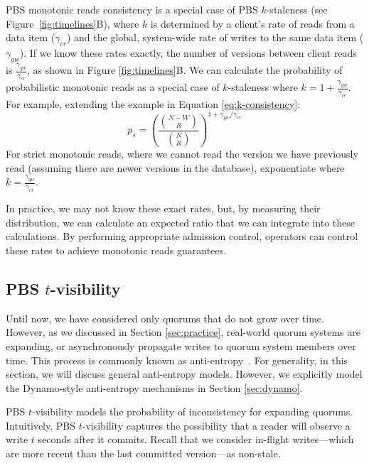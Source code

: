 \documentclass{vldb}
\newcommand{\subsectionskip}{-0em}
\begin{document}
PBS monotonic reads consistency is a special case of PBS $k$-staleness (see
Figure~\ref{fig:timelines}B), where $k$ is determined by a client's
rate of reads from a data item ($\gamma_{cr}$) and the global,
system-wide rate of writes to the same data item ($\gamma_{gw}$).  If
we know these rates exactly, the number of versions between client
reads is $\frac{\gamma_{gw}}{\gamma_{cr}}$, as shown in Figure
\ref{fig:timelines}B.  We can calculate the probability of
probabilistic monotonic reads as a special case of $k$-staleness where
$k=1+\frac{\gamma_{gw}}{\gamma_{cr}}$.  For example, extending the
example in Equation \ref{eq:k-consistency}:
\begin{equation}
\label{eq:prob-mr}
p_{s} = \left(\frac{{N-W \choose R}}{{N \choose R}}\right)^{1+\gamma_{gw}/\gamma_{cr}}
\end{equation}
For strict monotonic reads, where we cannot read the version we have
previously read (assuming there are newer versions in the database),
exponentiate where $k=\frac{\gamma_{gw}}{\gamma_{cr}}$.

In practice, we may not know these exact rates, but, by measuring
their distribution, we can calculate an expected ratio that we can
integrate into these calculations.  By performing appropriate
admission control, operators can control these rates to achieve
monotonic reads guarantees.

\vspace{\subsectionskip}\subsection{PBS $t$-visibility}
\label{sec:tvis}

Until now, we have considered only quorums that do not grow over time.
However, as we discussed in Section \ref{sec:practice}, real-world quorum
systems are expanding, or asynchronously propagate writes to quorum system
members over time.  This process is commonly known as
anti-entropy~\cite{antientropy}.  For generality, in this section, we
will discuss general anti-entropy models. However, we explicitly model
the Dynamo-style anti-entropy mechanisms in Section \ref{sec:dynamo}.

PBS $t$-visibility models the probability of inconsistency for
expanding quorums.  Intuitively, PBS $t$-visibility captures the
possibility that a reader will observe a write $t$ seconds after it
commits.  Recall that we consider in-flight writes---which are more
recent than the last committed version---as non-stale.
\end{document}
